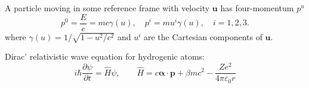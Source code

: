 \documentclass[a4paper,lang=cn,a4paper]{elegantpaper}
\newcommand{\vect}[1]{\boldsymbol{#1}}
\begin{document}
A particle moving in some reference frame with velocity $\vect{u}$ has
four-momentum $p^u$ 
\begin{equation*}
    p^0=\frac{E}{c}=mc\gamma(u), \quad p^i =mu^i \gamma(u),\quad i=1,2,3.
\end{equation*}
where $\gamma(u)=1/\sqrt{1-u^2/c^2}$ and $u^i$ are the Cartesian components 
of $\vect{u}$.

Dirac' relativistic wave equation for hydrogenic atoms:
\begin{equation*}
    i\hbar\frac{\partial \psi}{\partial t}=\hat{H}\psi,\qquad 
    \hat{H}=c\vect{\alpha}\cdot\vect{p}+\beta mc^2-\frac{Ze^2}{4 \pi \varepsilon_0 r}
\end{equation*}
\end{document}
